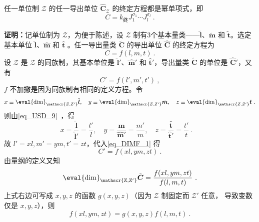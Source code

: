 \begin{theorem}{}\label{the_DIMF_2}
任一单位制 $\mathscr{Z}$ 的任一导出单位 $\hat{\boldsymbol{C}}_{ \mathscr{Z}}$ 的终定方程都是幂单项式，即
\begin{equation}\label{eq_DIMF_6}
C=k_{\text{终}}J_1^{\sigma_1}\cdots J_l^{\sigma_l}~.
\end{equation}
\end{theorem}
\textbf{证明：}记单位制为 $\mathscr{Z}$，为便于陈述，设 $\mathscr{Z}$ 制有3个基本量类——$\tilde{\boldsymbol{l}}$、$\tilde{\boldsymbol{m}}$ 和 $\tilde{\boldsymbol{t}}$。选定基本单位 $\hat{\boldsymbol{l}}$、$\hat{\boldsymbol{m}}$ 和 $\hat{\boldsymbol{t}}$ 。任一导出量类 $\tilde{\boldsymbol{C}}$ 的导出单位 $\hat{\boldsymbol{C}}$ 的终定方程为
\begin{equation}
C=f(l,m,t)~.
\end{equation}
设 $\mathscr{Z}$ 是 $\mathscr{Z}$ 的同族制，其基本单位是 $\hat{\boldsymbol{l}}'$、$\hat{\boldsymbol{m}}'$ 和 $\hat{\boldsymbol{t}}'$，导出量类 $\tilde{\boldsymbol{C}}$ 的单位是  $\hat{\boldsymbol{C}}'$，又有
\begin{equation}\label{eq_DIMF_1}
C'=f(l',m',t')~,
\end{equation}
$f$ 不加撇是因为同族制有相同的定义方程。令
\begin{equation}
x\equiv \eval{\mathrm{dim}}_{\mathscr{Z,Z'}}\tilde{\boldsymbol{l}},\quad y\equiv \eval{\mathrm{dim}}_{\mathscr{Z,Z'}}\tilde{\boldsymbol{m}},\quad z\equiv \eval{\mathrm{dim}}_{\mathscr{Z,Z'}}\tilde{\boldsymbol{t}}~.
\end{equation}
则由\autoref{eq_USD_9}~，得
\begin{equation}
x=\frac{\hat{\boldsymbol{l}}}{\hat{\boldsymbol{l}}'}=\frac{l'}{l},\quad y=\frac{\hat{\boldsymbol{m}}}{\hat{\boldsymbol{m}}'}=\frac{m'}{m},\quad z=\frac{\hat{\boldsymbol{t}}}{\hat{\boldsymbol{t}}'}=\frac{t'}{t}~.\quad 
\end{equation}
故 $l'=xl,m'=ym,t'=zt$，代入\autoref{eq_DIMF_1} 得
\begin{equation}
C'=f(xl,ym,zt)~.
\end{equation}
由量纲的定义又知
\begin{equation}
\mathrm{\eval{dim}_{\mathscr{Z,Z'
}}}\tilde{\boldsymbol{C}}=\frac{f(xl,ym,zt)}{f(l,m,t)}~.
\end{equation}
上式右边可写成 $x,y,z$ 的函数 $g(x,y,z)$（因为 $\mathcal{Z}$ 制固定而 $\mathscr{Z'}$ 任意， 导致变数仅是 $x,y,z$），则
\begin{equation}\label{eq_DIMF_2}
f(xl,ym,zt)=g(x,y,z)f(l,m,t)~.
\end{equation}
